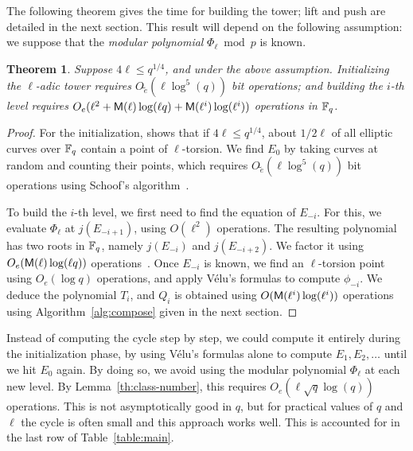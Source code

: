 \documentclass{sig-alternate}
\newtheorem{theorem}[definition]{Theorem}
\begin{document}
The following theorem gives the time for building the tower; lift and
push are detailed in the next section. This result will depend on the
following assumption: we suppose that the {\em modular polynomial}
$\Phi_\ell\bmod p$ is known.

\begin{theorem}\label{theo:elliptic}
  Suppose $4\ell\le q^{1/4}$, and under the above assumption.
  Initializing the $\ell$-adic tower requires
  $O\tilde{_e}(\ell\log^5(q))$ bit operations; and building the $i$-th
  level requires $O_e(\ell^2+\mathsf{M}(\ell)\log(\ell
  q)+\mathsf{M}(\ell^i)\log(\ell^i))$ operations in $\mathbb{F}_q$.
\end{theorem}
\begin{proof}
  For the initialization, \cite[Section~4.3]{couveignes+lercier11}
  shows that if $4\ell\le q^{1/4}$, about $1/2\ell$ of all elliptic
  curves over $\mathbb{F}_q$ contain a point of $\ell$-torsion. We find $E_0$
  by taking curves at random and counting their points, which requires
  $O\tilde{_e}(\ell\log^5(q))$ bit operations using Schoof's
  algorithm~\cite{schoof95}.

  To build the $i$-th level, we first need to find the equation of
  $E_{-i}$. For this, we evaluate $\Phi_\ell$ at $j(E_{-i+1})$, using
  $O(\ell^2)$ operations. The resulting polynomial has two roots in
  $\mathbb{F}_q$, namely $j(E_{-i})$ and $j(E_{-i+2})$. We factor it using
  $O_e(\mathsf{M}(\ell)\log(\ell q))$ operations~\cite[Ch~14]{vzGG}. Once
  $E_{-i}$ is known, we find an $\ell$-torsion point using $O_e(\log
  q)$ operations, and apply Vélu's formulas to compute $\phi_{-i}$. We
  deduce the polynomial $T_i$, and $Q_i$ is obtained using
  $O(\mathsf{M}(\ell^i)\log(\ell^i))$ operations using
  Algorithm~\ref{alg:compose} given in the next section.
\end{proof}

Instead of computing the cycle step by step, we could compute it
entirely during the initialization phase, by using Vélu's formulas
alone to compute $E_1,E_2,\dots$ until we hit $E_0$ again. By doing
so, we avoid using the modular polynomial $\Phi_\ell$ at each new
level. By Lemma~\ref{th:class-number}, this requires
$O_e(\ell\sqrt{q}\log(q))$ operations. This is not asymptotically good
in $q$, but for practical values of $q$ and $\ell$ the cycle is often
small and this approach works well. This is accounted for in the last
row of Table~\ref{table:main}.

\end{document}
